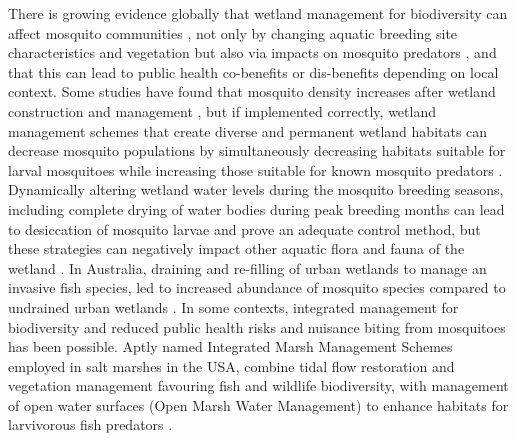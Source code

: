\documentclass[lineno,sn-basic]{sn-jnl}%
\begin{document}
There is growing evidence globally that wetland management for biodiversity can affect mosquito communities \citep{reyNorthAmericanWetlands2012}, not only by changing aquatic breeding site characteristics and vegetation but also via impacts on mosquito predators \citep{griffinReviewRoleFish2012, sahaPredationPotentialOdonates2012}, and that this can lead to public health co-benefits or dis-benefits depending on local context. Some studies have found that mosquito density increases after wetland construction and management \citep{schaferBiologicalDiversityRisk2004, jianninoEvaluationVegetationManagement2004}, but if implemented correctly, wetland management schemes that create diverse and permanent wetland habitats can decrease mosquito populations by simultaneously decreasing habitats suitable for larval mosquitoes while increasing those suitable for known mosquito predators \citep{james-pirriEffectsOpenMarsh2009, rochlinIntegratedMarshManagement2012a, rosePesticidesPublicHealth2001a}. Dynamically altering wetland water levels during the mosquito breeding seasons, including complete drying of water bodies during peak breeding months can lead to desiccation of mosquito larvae and prove an adequate control method,  but  these strategies can negatively impact other aquatic flora and fauna of the wetland \citep{russellConstructedWetlandsMosquitoes1999a}. In Australia, draining and re-filling of urban wetlands to manage an invasive fish species, led to increased abundance of mosquito species compared to undrained urban wetlands \citep{hanfordManagementUrbanWetlands2020}. In some contexts, integrated management for biodiversity and reduced public health risks and nuisance biting from mosquitoes has been possible. Aptly named Integrated Marsh Management Schemes employed in salt marshes in the USA, combine tidal flow restoration and vegetation management favouring fish and wildlife biodiversity, with management of open water surfaces (Open Marsh Water Management) to enhance habitats for larvivorous fish predators \citep{rochlinEffectsIntegratedMarsh2012}.
\end{document}
